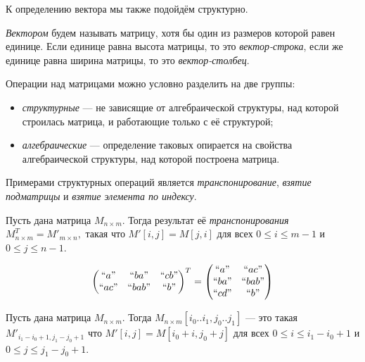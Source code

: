 К определению вектора мы также подойдём структурно.

\begin{definition}

\emph{Вектором} будем называть матрицу, хотя бы один из размеров которой равен единице. Если единице равна высота матрицы, то это \textit{вектор-строка}, если же единице равна ширина матрицы, то это \textit{вектор-столбец}.

\end{definition}


Операции над матрицами можно условно разделить на две группы:
\begin{itemize}
	\item \textit{структурные} --- не зависящие от алгебраической структуры, над которой строилась матрица, и работающие только с её структурой;
	\item \textit{алгебраические} --- определение таковых опирается на свойства алгебраической структуры, над которой построена матрица.
\end{itemize}

Примерами структурных операций является \textit{транспонирование}, \textit{взятие подматрицы} и \textit{взятие элемента по индексу}.

\begin{definition}
Пусть дана матрица $M_{n\times m}$. Тогда результат её \emph{транспонирования}
$
M_{n\times m}^T = M'_{m\times n},
$
такая что $M'[i,j] = M[j,i]$ для всех $0\leq i \leq m - 1$ и $0\leq j \leq n - 1$.
\end{definition}

\begin{example}
$$
\begin{pmatrix}
``a"  & ``ba"  & ``cb" \\
``ac" & ``bab" & ``b"  \\
\end{pmatrix}^T =
\begin{pmatrix}
``a"  & ``ac"  \\
``ba" & ``bab" \\
``cd" & ``b" \\
\end{pmatrix}
$$
\end{example}

\begin{definition}
Пусть дана матрица $M_{n\times m}$. Тогда
$
M_{n\times m}[i_0..i_1,j_0..j_1]
$
 --- это такая $M'_{i_1 - i_0 + 1, j_1 - j_0 + 1}$ что $M'[i,j] = M[i_0 + i,j_0 + j]$ для всех $0\leq i \leq i_1 - i_0 + 1$ и $0\leq j \leq j_1 - j_0 + 1$.
\end{definition}


